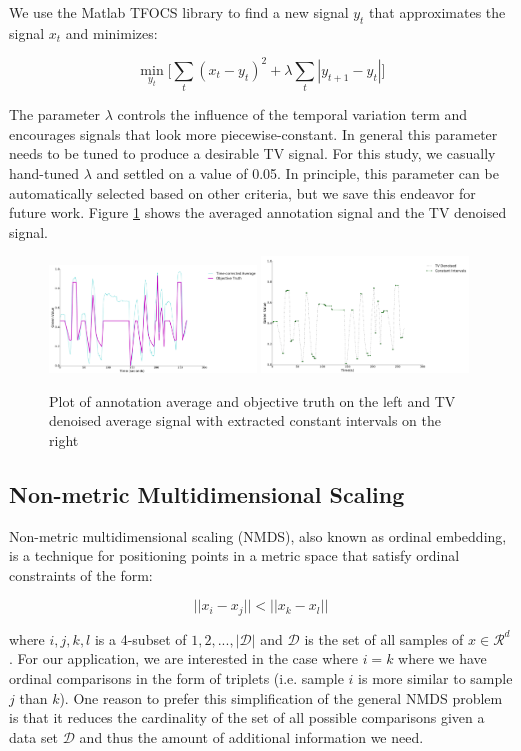 \documentclass[]{article}
\begin{document}
We use the Matlab TFOCS library to find a new signal $y_t$ that approximates the signal $x_t$ and minimizes:

\[
\min_{y_t} \Big[\sum_{t} (x_t - y_t)^2 + \lambda\sum_{t} |y_{t+1} - y_{t}|\Big]
\]

The parameter $\lambda$ controls the influence of the temporal variation term and encourages signals that look more piecewise-constant.  In general this parameter needs to be tuned to produce a desirable TV signal.  For this study, we casually hand-tuned $\lambda$ and settled on a value of 0.05.  In principle, this parameter can be automatically selected based on other criteria, but we save this endeavor for future work.  Figure \ref{fig:average_and_objective} shows the averaged annotation signal and the TV denoised signal.

\begin{figure}
	\centering
	\includegraphics[width=0.49\textwidth]{images/average_and_objective}
	\includegraphics[width=0.49\textwidth]{images/tv_and_intervals}
	\caption{Plot of annotation average and objective truth on the left and TV denoised average signal with extracted constant intervals on the right}
	\label{fig:average_and_objective}
\end{figure}

\subsection{Non-metric Multidimensional Scaling}
Non-metric multidimensional scaling (NMDS), also known as ordinal embedding, is a technique for positioning points in a metric space that satisfy ordinal constraints of the form:

\[
||x_i - x_j|| < ||x_k - x_l||
\]

where ${i,j,k,l}$ is a 4-subset of ${1,2,...,|\mathcal{D}|}$ and $\mathcal{D}$ is the set of all samples of $x \in \mathcal{R}^d$.  For our application, we are interested in the case where $i=k$ where we have ordinal comparisons in the form of triplets (i.e. sample $i$ is more similar to sample $j$ than $k$).  One reason to prefer this simplification of the general NMDS problem is that it reduces the cardinality of the set of all possible comparisons given a data set $\mathcal{D}$ and thus the amount of additional information we need.
\end{document}
